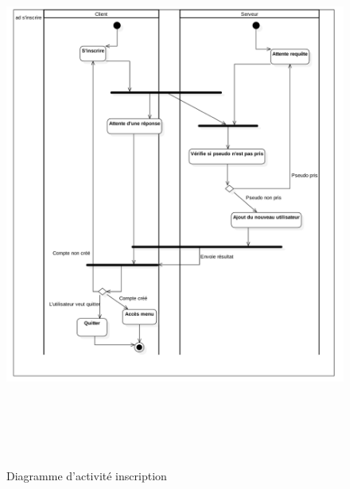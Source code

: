 \documentclass[12pt,a4paper]{article}
\begin{document}
\begin{center}
\begin{figure}[H]
    \includegraphics[height=18cm,width=18cm]{register.png}
    \caption{Diagramme d'activité inscription}
    \label{fig:picture}
 \end{figure}
\end{center}
\end{document}
